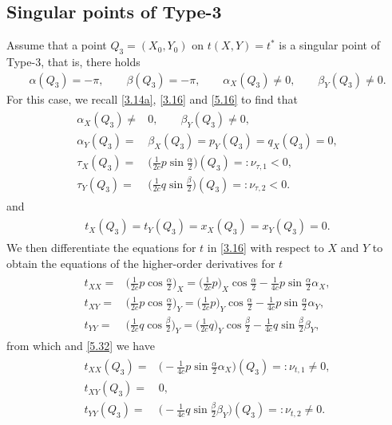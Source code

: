 \documentclass[11pt,reqno]{article}
\newcommand{\fr}{\frac}
\numberwithin{equation}{section}
\begin{document}
\subsection{Singular points of Type-3}\label{S53}

Assume that a point $Q_3=(X_0,Y_0)$ on $t(X,Y)=t^*$ is a singular point of Type-3, that is, there holds
\begin{align}\label{5.31}
\alpha(Q_3)=-\pi,\qquad \beta(Q_3)=-\pi, \qquad \alpha_{X}(Q_3)\neq0,\qquad  \beta_Y(Q_3)\neq0.
\end{align}
For this case, we recall \eqref{3.14a}, \eqref{3.16} and \eqref{5.16} to find that
\begin{align}\label{5.32}
\begin{split}
\alpha_X(Q_3)\neq&0, \qquad \beta_{Y}(Q_3)\neq0, \\[4pt]
\alpha_Y(Q_3)=&\beta_X(Q_3)=p_Y(Q_3)= q_X(Q_3)=0, \\[4pt]
\tau_X(Q_3)=&\Big(\fr{1}{2c}p\sin\fr{\alpha}{2}\Big)(Q_3)=:\nu_{\tau, 1}<0,\\[4pt]
\tau_Y(Q_3)=&\Big(\fr{1}{2c}q\sin\fr{\beta}{2}\Big)(Q_3)=:\nu_{\tau, 2}<0.
\end{split}
\end{align}
and
\begin{align}\label{5.33}
\begin{split}
t_X(Q_3)=t_Y(Q_3)=x_X(Q_3)=x_Y(Q_3)=0.
\end{split}
\end{align}
We then differentiate the equations for $t$ in \eqref{3.16} with respect to $X$ and $Y$ to obtain the equations of the higher-order derivatives for $t$
\begin{align}\label{5.34}
\begin{split}
t_{XX}=&\Big(\fr{1}{2c}p\cos\fr{\alpha}{2}\Big)_X =\Big(\fr{1}{2c}p\Big)_X\cos\fr{\alpha}{2} -\fr{1}{4c}p\sin\fr{\alpha}{2}\alpha_X, \\[4pt]
t_{XY}=&\Big(\fr{1}{2c}p\cos\fr{\alpha}{2}\Big)_Y =\Big(\fr{1}{2c}p\Big)_Y\cos\fr{\alpha}{2} -\fr{1}{4c}p\sin\fr{\alpha}{2}\alpha_Y, \\[4pt]
t_{YY}=&\Big(\fr{1}{2c}q\cos\fr{\beta}{2}\Big)_Y = \Big(\fr{1}{2c}q\Big)_Y\cos\fr{\beta}{2} -\fr{1}{4c}q\sin\fr{\beta}{2}\beta_Y,
\end{split}
\end{align}
from which and \eqref{5.32} we have
\begin{align}\label{5.35}
\begin{split}
t_{XX}(Q_3)=& \Big(-\fr{1}{4c}p\sin\fr{\alpha}{2}\alpha_X\Big)(Q_3)=:\nu_{t,1}\neq0, \\[4pt]
t_{XY}(Q_3)=&0, \\[4pt]
t_{YY}(Q_3)=& \Big( -\fr{1}{4c}q\sin\fr{\beta}{2}\beta_Y\Big)(Q_3)=:\nu_{t,2}\neq0.
\end{split}
\end{align}
\end{document}
